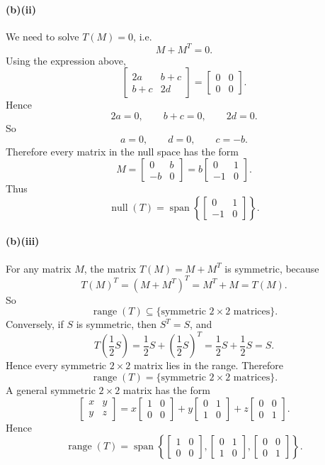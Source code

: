 \documentclass[12pt]{article}
\newcommand{\Null}{\operatorname{null}}
\newcommand{\Range}{\operatorname{range}}
\newcommand{\Span}{\operatorname{span}}
\begin{document}
\paragraph{(b)(ii)}
We need to solve $T(M)=0$, i.e.
\[
M+M^T=0.
\]
Using the expression above,
\[
\begin{bmatrix}2a&b+c\\b+c&2d\end{bmatrix}
=
\begin{bmatrix}0&0\\0&0\end{bmatrix}.
\]
Hence
\[
2a=0,\qquad b+c=0,\qquad 2d=0.
\]
So
\[
a=0,\qquad d=0,\qquad c=-b.
\]
Therefore every matrix in the null space has the form
\[
M=\begin{bmatrix}0&b\\-b&0\end{bmatrix}
=b\begin{bmatrix}0&1\\-1&0\end{bmatrix}.
\]
Thus
\[
\boxed{
\Null(T)=\Span\left\{
\begin{bmatrix}0&1\\-1&0\end{bmatrix}
\right\}.}
\]

\paragraph{(b)(iii)}
For any matrix $M$, the matrix $T(M)=M+M^T$ is symmetric, because
\[
T(M)^T=(M+M^T)^T=M^T+M=T(M).
\]
So
\[
\Range(T)\subseteq\{\text{symmetric }2\times2\text{ matrices}\}.
\]
Conversely, if $S$ is symmetric, then $S^T=S$, and
\[
T\left(\frac12S\right)=\frac12S+\left(\frac12S\right)^T
=\frac12S+\frac12S=S.
\]
Hence every symmetric $2\times2$ matrix lies in the range. Therefore
\[
\Range(T)=\{\text{symmetric }2\times2\text{ matrices}\}.
\]
A general symmetric $2\times2$ matrix has the form
\[
\begin{bmatrix}x&y\\y&z\end{bmatrix}
=x\begin{bmatrix}1&0\\0&0\end{bmatrix}
+y\begin{bmatrix}0&1\\1&0\end{bmatrix}
+z\begin{bmatrix}0&0\\0&1\end{bmatrix}.
\]
Hence
\[
\boxed{
\Range(T)=\Span\left\{
\begin{bmatrix}1&0\\0&0\end{bmatrix},
\begin{bmatrix}0&1\\1&0\end{bmatrix},
\begin{bmatrix}0&0\\0&1\end{bmatrix}
\right\}.}
\]
\end{document}
